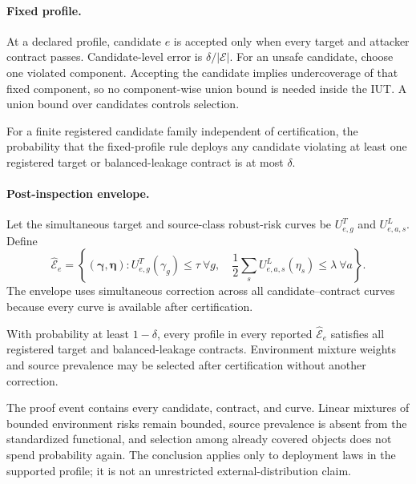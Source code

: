 \paragraph{Fixed profile.}
At a declared profile, candidate $e$ is accepted only when every target and
attacker contract passes. Candidate-level error is $\delta/|\mathcal E|$. For
an unsafe candidate, choose one violated component. Accepting the candidate
implies undercoverage of that fixed component, so no component-wise union bound
is needed inside the IUT. A union bound over candidates controls selection.

\begin{theorem}
\label{neurips:thm:fixed}
For a finite registered candidate family independent of certification, the
probability that the fixed-profile rule deploys any candidate violating at least
one registered target or balanced-leakage contract is at most $\delta$.
\end{theorem}

\paragraph{Post-inspection envelope.}
Let the simultaneous target and source-class robust-risk curves be
$U^T_{e,g}$ and $U^L_{e,a,s}$. Define
\begin{equation}
\widehat{\mathcal E}_e=\left\{(\boldsymbol\gamma,\boldsymbol\eta):
U^T_{e,g}(\gamma_g)\le\tau\ \forall g,
\quad \frac12\sum_sU^L_{e,a,s}(\eta_s)\le\lambda\ \forall a\right\}.
\label{neurips:eq:envelope}
\end{equation}
The envelope uses simultaneous correction across all candidate--contract
curves because every curve is available after certification.

\begin{theorem}
\label{neurips:thm:envelope}
With probability at least $1-\delta$, every profile in every reported
$\widehat{\mathcal E}_e$ satisfies all registered target and balanced-leakage
contracts. Environment mixture weights and source prevalence may be selected
after certification without another correction.
\end{theorem}

The proof event contains every candidate, contract, and curve. Linear mixtures
of bounded environment risks remain bounded, source prevalence is absent from
the standardized functional, and selection among already covered objects does
not spend probability again. The conclusion applies only to deployment laws in
the supported profile; it is not an unrestricted external-distribution claim.


